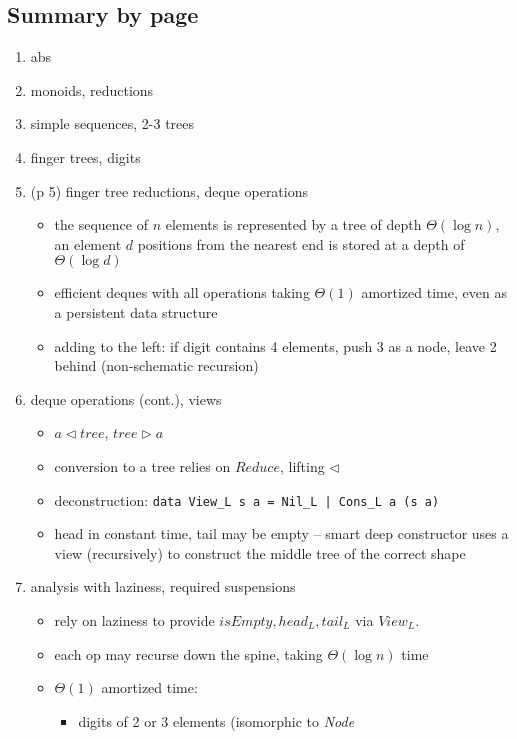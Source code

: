 \documentclass[a4paper]{article}
\begin{document}
\subsection*{Summary by page}
\begin{enumerate}[nosep]
	\item abs
	\item monoids, reductions
	\item simple sequences, 2-3 trees
	\item finger trees, digits
	\item (p 5) finger tree reductions, deque operations
		\begin{itemize}
			\item the sequence of $n$ elements is represented by a tree of
				depth $\Theta(\log n)$, an element $d$ positions from the
				nearest end is stored at a depth of $\Theta(\log d)$
			\item efficient deques with all operations taking $\Theta(1)$
				amortized time, even as a persistent data structure
			\item adding to the left: if digit contains 4 elements, push 3 as a
				node, leave 2 behind (non-schematic recursion)
		\end{itemize}
	\item deque operations (cont.), views
		\begin{itemize}
			\item $a \triangleleft tree$, $tree \triangleright a$
			\item conversion to a tree relies on $Reduce$, lifting $\triangleleft$
			\item deconstruction: \texttt{data View\_L s a = Nil\_L | Cons\_L a (s a)}
			\item head in constant time, tail may be empty -- smart deep
				constructor uses a view (recursively) to construct the middle
				tree of the correct shape
		\end{itemize}
	\item analysis with laziness, required suspensions
		\begin{itemize}
			\item rely on laziness to provide $\mathit{isEmpty, head_L,
				tail_L}$ via $\mathit{View_L}$.
			\item each op may recurse down the spine, taking $\Theta(\log n)$ time
			\item $\Theta(1)$ amortized time:
				\begin{itemize}
					\item digits of 2 or 3 elements (isomorphic to \textit{Node
}
\end{itemize}
\end{itemize}
\end{enumerate}
\end{document}
